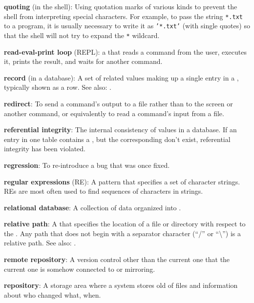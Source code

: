 \documentclass{book}
\begin{document}
\textbf{quoting} (in the shell): Using quotation marks of various kinds
to prevent the shell from interpreting special characters. For example,
to pass the string \texttt{*.txt} to a program, it is usually necessary
to write it as \texttt{'*.txt'} (with single quotes) so that the shell
will not try to expand the \texttt{*} wildcard.

\textbf{read-eval-print loop} (REPL): a  that reads a command from the user, executes it, prints the
result, and waits for another command.

\textbf{record} (in a database): A set of related values making up a
single entry in a , typically
shown as a row. See also: .

\textbf{redirect}: To send a command's output to a file rather than to
the screen or another command, or equivalently to read a command's input
from a file.

\textbf{referential integrity}: The internal consistency of values in a
database. If an entry in one table contains a
, but the corresponding
 don't exist, referential integrity
has been violated.

\textbf{regression}: To re-introduce a bug that was once fixed.

\textbf{regular expressions} (RE): A pattern that specifies a set of
character strings. REs are most often used to find sequences of
characters in strings.

\textbf{relational database}: A collection of data organized into
.

\textbf{relative path}: A  that specifies the
location of a file or directory with respect to the
. Any
path that does not begin with a separator character (``/'' or
``\textbackslash{}'') is a relative path. See also:
.

\textbf{remote repository}: A version control
 other than the current one that the
current one is somehow connected to or mirroring.

\textbf{repository}: A storage area where a
 system stores old
 of files and information about who
changed what, when.
\end{document}
